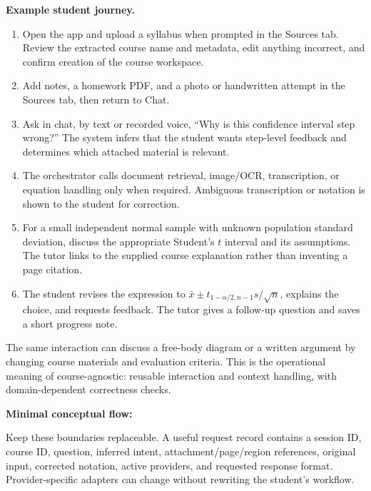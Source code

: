 \documentclass[11pt]{article}
\begin{document}
\textbf{Example student journey.}
\begin{enumerate}
\item Open the app and upload a syllabus when prompted in the Sources tab. Review the extracted course name and metadata, edit anything incorrect, and confirm creation of the course workspace.
\item Add notes, a homework PDF, and a photo or handwritten attempt in the Sources tab, then return to Chat.
\item Ask in chat, by text or recorded voice, ``Why is this confidence interval step wrong?'' The system infers that the student wants step-level feedback and determines which attached material is relevant.
\item The orchestrator calls document retrieval, image/OCR, transcription, or equation handling only when required. Ambiguous transcription or notation is shown to the student for correction.
\item For a small independent normal sample with unknown population standard deviation, discuss the appropriate Student's $t$ interval and its assumptions. The tutor links to the supplied course explanation rather than inventing a page citation.
\item The student revises the expression to $\bar{x}\pm t_{1-\alpha/2,n-1}s/\sqrt{n}$, explains the choice, and requests feedback. The tutor gives a follow-up question and saves a short progress note.
\end{enumerate}

The same interaction can discuss a free-body diagram or a written argument by changing course materials and evaluation criteria. This is the operational meaning of course-agnostic: reusable interaction and context handling, with domain-dependent correctness checks.

\textbf{Minimal conceptual flow:}
\begin{center}
\end{center}
Keep these boundaries replaceable. A useful request record contains a session ID, course ID, question, inferred intent, attachment/page/region references, original input, corrected notation, active providers, and requested response format. Provider-specific adapters can change without rewriting the student's workflow.
\end{document}
